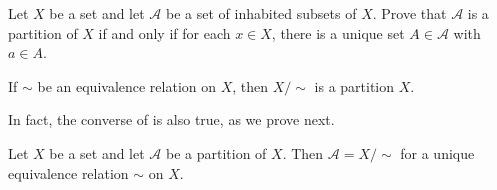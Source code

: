 \begin{exercise}
\label{exConditionsForPartition}
Let $X$ be a set and let $\mathcal{A}$ be a set of inhabited subsets of $X$. Prove that $\mathcal{A}$ is a partition of $X$ if and only if for each $x \in X$, there is a unique set $A \in \mathcal{A}$ with $a \in A$.
\end{exercise}

\begin{exercise}
\label{exQuotientIsPartition}
If $\sim$ be an equivalence relation on $X$, then $X/{\sim}$ is a partition $X$.
\end{exercise}

In fact, the converse of  is also true, as we prove next.

\begin{proposition}
\label{propPartitionIsQuotientByEquivalenceRelation}
Let $X$ be a set and let $\mathcal{A}$ be a partition of $X$. Then $\mathcal{A}=X/{\sim}$ for a unique equivalence relation $\sim$ on $X$.
\end{proposition}


